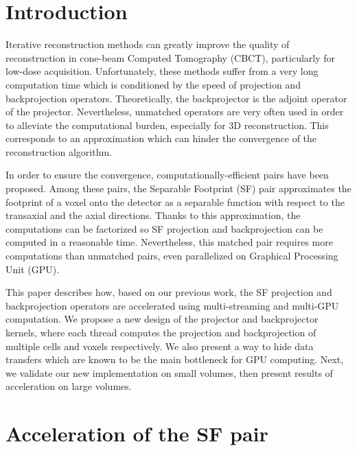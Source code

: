 \documentclass[12pt]{spieman}  %
\begin{document}
\begin{spacing}{1}   %

\section{Introduction}
\label{sect:intro}


Iterative reconstruction methods can greatly improve the quality of reconstruction in cone-beam Computed Tomography (CBCT), particularly for low-dose acquisition\cite{long20103d}. Unfortunately, these methods suffer from a very long computation time which is conditioned by the speed of projection and backprojection operators. Theoretically, the backprojector is the adjoint operator of the projector. Nevertheless,  unmatched operators are very often used in order to alleviate the computational burden, especially for 3D reconstruction. This corresponds to an approximation which can hinder the convergence of the reconstruction algorithm\cite{arcadu2016crucial}. 

In order to ensure the convergence, computationally-efficient pairs have been proposed\cite{de2004distance, long20103d}. Among these pairs, the Separable Footprint (SF) pair\cite{long20103d} approximates the footprint of a voxel onto the detector as a separable function with respect to the transaxial and the axial directions. Thanks to this approximation, the computations can be factorized so SF projection and backprojection can be computed in a reasonable time. Nevertheless, this matched pair requires more computations than unmatched pairs, even parallelized on Graphical Processing Unit (GPU)\cite{wu2011gpu, xie2017accelerating, chapdelaine2018new}.

This paper describes how, based on our previous work\cite{chapdelaine2018new}, the SF projection and backprojection operators are accelerated using multi-streaming and multi-GPU computation. We propose a new design of the projector and backprojector kernels, where each thread computes the projection and backprojection of multiple cells and voxels respectively. We also present a way to hide data transfers which are known to be the main bottleneck for GPU computing. Next, we validate our new implementation on small volumes, then present results of acceleration on large volumes.


\section{Acceleration of the SF pair}
\label{sect:Matchedpair}



\end{spacing}
\end{document}
